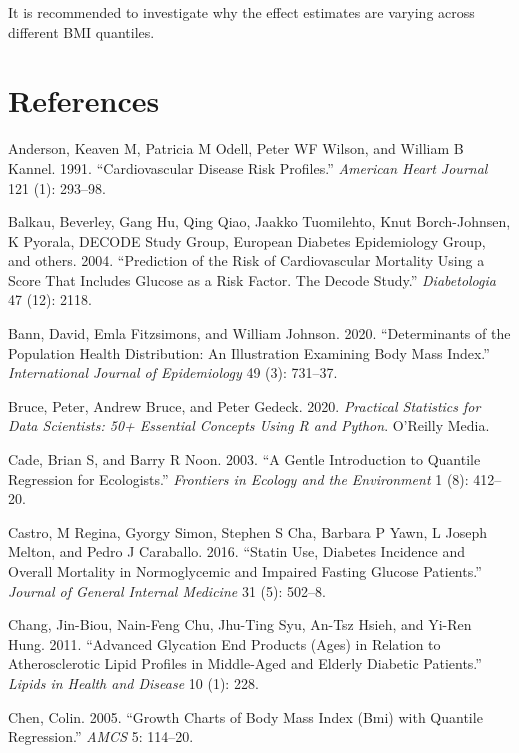\documentclass[
  12pt,
]{article}
\begin{document}
It is recommended to investigate why the effect estimates are varying across different BMI quantiles.

\newpage
\section{References}

\hypertarget{refs}{}
\leavevmode\hypertarget{ref-anderson1991}{}%
Anderson, Keaven M, Patricia M Odell, Peter WF Wilson, and William B Kannel. 1991. ``Cardiovascular Disease Risk Profiles.'' \emph{American Heart Journal} 121 (1): 293--98.

\leavevmode\hypertarget{ref-balkau2004prediction}{}%
Balkau, Beverley, Gang Hu, Qing Qiao, Jaakko Tuomilehto, Knut Borch-Johnsen, K Pyorala, DECODE Study Group, European Diabetes Epidemiology Group, and others. 2004. ``Prediction of the Risk of Cardiovascular Mortality Using a Score That Includes Glucose as a Risk Factor. The Decode Study.'' \emph{Diabetologia} 47 (12): 2118.

\leavevmode\hypertarget{ref-bann2020}{}%
Bann, David, Emla Fitzsimons, and William Johnson. 2020. ``Determinants of the Population Health Distribution: An Illustration Examining Body Mass Index.'' \emph{International Journal of Epidemiology} 49 (3): 731--37.

\leavevmode\hypertarget{ref-bruce2020}{}%
Bruce, Peter, Andrew Bruce, and Peter Gedeck. 2020. \emph{Practical Statistics for Data Scientists: 50+ Essential Concepts Using R and Python}. O'Reilly Media.

\leavevmode\hypertarget{ref-cade2003}{}%
Cade, Brian S, and Barry R Noon. 2003. ``A Gentle Introduction to Quantile Regression for Ecologists.'' \emph{Frontiers in Ecology and the Environment} 1 (8): 412--20.

\leavevmode\hypertarget{ref-castro2016}{}%
Castro, M Regina, Gyorgy Simon, Stephen S Cha, Barbara P Yawn, L Joseph Melton, and Pedro J Caraballo. 2016. ``Statin Use, Diabetes Incidence and Overall Mortality in Normoglycemic and Impaired Fasting Glucose Patients.'' \emph{Journal of General Internal Medicine} 31 (5): 502--8.

\leavevmode\hypertarget{ref-chang2011}{}%
Chang, Jin-Biou, Nain-Feng Chu, Jhu-Ting Syu, An-Tsz Hsieh, and Yi-Ren Hung. 2011. ``Advanced Glycation End Products (Ages) in Relation to Atherosclerotic Lipid Profiles in Middle-Aged and Elderly Diabetic Patients.'' \emph{Lipids in Health and Disease} 10 (1): 228.

\leavevmode\hypertarget{ref-chen2005}{}%
Chen, Colin. 2005. ``Growth Charts of Body Mass Index (Bmi) with Quantile Regression.'' \emph{AMCS} 5: 114--20.
\end{document}
